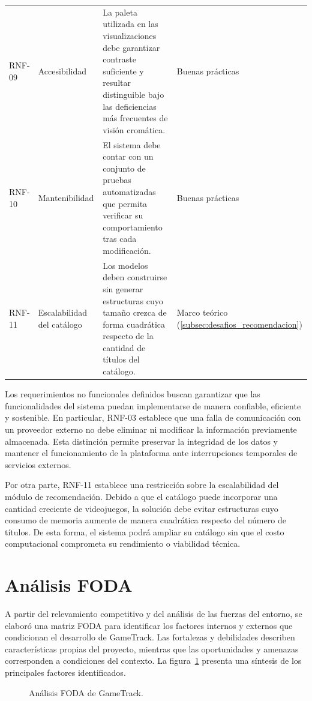 \begin{longtable}{|>{\raggedright\arraybackslash}p{1.1cm}|>{\raggedright\arraybackslash}p{2cm}|>{\raggedright\arraybackslash}p{7cm}|>{\raggedright\arraybackslash}p{2.6cm}|}
	RNF-09 & Accesibilidad & La paleta utilizada en las visualizaciones debe garantizar contraste suficiente y resultar distinguible bajo las deficiencias más frecuentes de visión cromática. & Buenas prácticas \\
	RNF-10 & Mantenibilidad & El sistema debe contar con un conjunto de pruebas automatizadas que permita verificar su comportamiento tras cada modificación. & Buenas prácticas \\
	RNF-11 & Escalabilidad del catálogo & Los modelos deben construirse sin generar estructuras cuyo tamaño crezca de forma cuadrática respecto de la cantidad de títulos del catálogo. & Marco teórico (\ref{subsec:desafios_recomendacion}) \\
\end{longtable}

Los requerimientos no funcionales definidos buscan garantizar que las funcionalidades del sistema puedan implementarse de manera confiable, eficiente y sostenible. En particular, RNF-03 establece que una falla de comunicación con un proveedor externo no debe eliminar ni modificar la información previamente almacenada. Esta distinción permite preservar la integridad de los datos y mantener el funcionamiento de la plataforma ante interrupciones temporales de servicios externos.

Por otra parte, RNF-11 establece una restricción sobre la escalabilidad del módulo de recomendación. Debido a que el catálogo puede incorporar una cantidad creciente de videojuegos, la solución debe evitar estructuras cuyo consumo de memoria aumente de manera cuadrática respecto del número de títulos. De esta forma, el sistema podrá ampliar su catálogo sin que el costo computacional comprometa su rendimiento o viabilidad técnica.

\section{Análisis FODA}\label{sec:foda}

A partir del relevamiento competitivo y del análisis de las fuerzas del entorno, se elaboró una matriz FODA para identificar los factores internos y externos que condicionan el desarrollo de GameTrack. Las fortalezas y debilidades describen características propias del proyecto, mientras que las oportunidades y amenazas corresponden a condiciones del contexto. La figura~\ref{fig:foda} presenta una síntesis de los principales factores identificados.

\begin{figure}[H]
	\centering
	\caption{Análisis FODA de GameTrack.}
	\label{fig:foda}
\end{figure}

